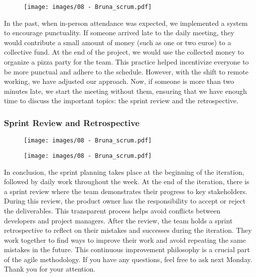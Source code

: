 \begin{figure}[!h]
  \centering
  \texttt{[image: images/08 - Bruna\_scrum.pdf]}
\end{figure}

In the past, when in-person attendance was expected, we implemented a
system to encourage punctuality. If someone arrived late to the daily
meeting, they would contribute a small amount of money (such as one or
two euros) to a collective fund. At the end of the project, we would use
the collected money to organize a pizza party for the team. This
practice helped incentivize everyone to be more punctual and adhere to
the schedule. However, with the shift to remote working, we have
adjusted our approach. Now, if someone is more than two minutes late, we
start the meeting without them, ensuring that we have enough time to
discuss the important topics: the sprint review and the retrospective.

\subsubsection{Sprint Review and Retrospective}

\begin{figure}[!h]
  \centering
  \texttt{[image: images/08 - Bruna\_scrum.pdf]}
\end{figure}

\begin{figure}[!h]
  \centering
  \texttt{[image: images/08 - Bruna\_scrum.pdf]}
\end{figure}

In conclusion, the sprint planning takes place at the beginning of the
iteration, followed by daily work throughout the week. At the end of the
iteration, there is a sprint review where the team demonstrates their
progress to key stakeholders. During this review, the product owner has
the responsibility to accept or reject the deliverables. This
transparent process helps avoid conflicts between developers and project
managers. After the review, the team holds a sprint retrospective to
reflect on their mistakes and successes during the iteration. They work
together to find ways to improve their work and avoid repeating the same
mistakes in the future. This continuous improvement philosophy is a
crucial part of the agile methodology. If you have any questions, feel
free to ask next Monday. Thank you for your attention.
